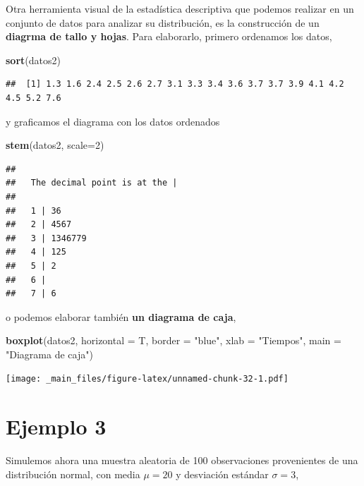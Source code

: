 \documentclass[
]{book}
\newenvironment{Shaded}{\begin{snugshade}}{\end{snugshade}}
\newcommand{\AttributeTok}[1]{\textcolor[rgb]{0.13,0.29,0.53}{#1}}
\newcommand{\DecValTok}[1]{\textcolor[rgb]{0.00,0.00,0.81}{#1}}
\newcommand{\FunctionTok}[1]{\textcolor[rgb]{0.13,0.29,0.53}{\textbf{#1}}}
\newcommand{\NormalTok}[1]{#1}
\newcommand{\StringTok}[1]{\textcolor[rgb]{0.31,0.60,0.02}{#1}}
\begin{document}
Otra herramienta visual de la estadística descriptiva que podemos realizar en un conjunto de datos para analizar su distribución, es la construcción de un \textbf{diagrma de tallo y hojas}. Para elaborarlo, primero ordenamos los datos,

\begin{Shaded}
\begin{Highlighting}[]
\FunctionTok{sort}\NormalTok{(datos2)}
\end{Highlighting}
\end{Shaded}

\begin{verbatim}
##  [1] 1.3 1.6 2.4 2.5 2.6 2.7 3.1 3.3 3.4 3.6 3.7 3.7 3.9 4.1 4.2 4.5 5.2 7.6
\end{verbatim}

y graficamos el diagrama con los datos ordenados

\begin{Shaded}
\begin{Highlighting}[]
\FunctionTok{stem}\NormalTok{(datos2, }\AttributeTok{scale=}\DecValTok{2}\NormalTok{)}
\end{Highlighting}
\end{Shaded}

\begin{verbatim}
## 
##   The decimal point is at the |
## 
##   1 | 36
##   2 | 4567
##   3 | 1346779
##   4 | 125
##   5 | 2
##   6 | 
##   7 | 6
\end{verbatim}

o podemos elaborar también \textbf{un diagrama de caja},

\begin{Shaded}
\begin{Highlighting}[]
\FunctionTok{boxplot}\NormalTok{(datos2, }\AttributeTok{horizontal =}\NormalTok{ T, }\AttributeTok{border =} \StringTok{"blue"}\NormalTok{, }
        \AttributeTok{xlab =} \StringTok{"Tiempos"}\NormalTok{, }\AttributeTok{main =} \StringTok{"Diagrama de caja"}\NormalTok{)}
\end{Highlighting}
\end{Shaded}

\texttt{[image: \_main\_files/figure-latex/unnamed-chunk-32-1.pdf]}

\hypertarget{ejemplo-3}{%
\section{Ejemplo 3}\label{ejemplo-3}}

Simulemos ahora una muestra aleatoria de 100 observaciones provenientes de una distribución normal, con media \(\mu = 20\) y desviación estándar \(\sigma = 3\),
\end{document}
